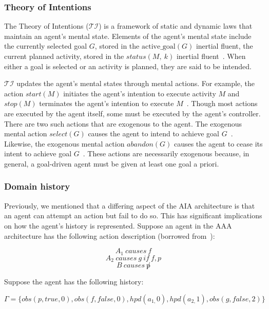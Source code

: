 \subsubsection{Theory of Intentions}
\label{subsubsec:theory_of_intentions}

The Theory of Intentions ($\mathcal{TI}$) is a framework of static and dynamic laws that maintain an agent's mental state.
Elements of the agent's mental state include the currently selected goal $G$, stored in the $\mathrm{active\_goal}\left(G\right)$ inertial fluent, the current planned activity, stored in the $status(M,\ k)$ inertial fluent~\cite{blount_towards_2014}.
When either a goal is selected or an activity is planned, they are said to be intended.

$\mathcal{TI}$ updates the agent's mental states through mental actions.
For example, the action $start(M)$ initiates the agent's intention to execute activity $M$ and $stop(M)$ terminates the agent's intention to execute $M$~\cite{blount_towards_2014}.
Though most actions are executed by the agent itself, some must be executed by the agent's controller.
There are two such actions that are exogenous to the agent.
The exogenous mental action $select(G)$ causes the agent to intend to achieve goal $G$~\cite{blount_towards_2014}.
Likewise, the exogenous mental action $abandon(G)$ causes the agent to cease its intent to achieve goal $G$~\cite{blount_towards_2014}.
These actions are necessarily exogenous because, in general, a goal-driven agent must be given at least one goal a priori.

\subsubsection{Domain history}
\label{subsubsec:domain_history}

Previously, we mentioned that a differing aspect of the AIA architecture is that an agent can attempt an action but fail to do so.
This has significant implications on how the agent's history is represented.
Suppose an agent in the AAA architecture has the following action description (borrowed from~\cite{blount_towards_2014}):

$$
A_1 \ causes \ f
$$
$$
A_2 \ causes \ g \ if \ f, p
$$
$$
B \ causes \ \not p
$$

Suppose the agent has the following history:

$$
\Gamma=\{obs\left(p,true,0\right),obs\left(f,false,0\right),hpd\left(a_{1,}0\right),hpd\left(a_{2,}1\right),obs\left(g,false,2\right)\}
$$

